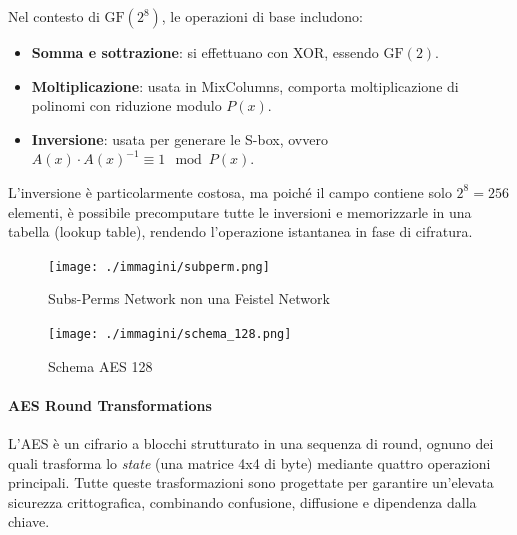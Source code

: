 \documentclass{report}
\begin{document}
Nel contesto di $\text{GF}(2^8)$, le operazioni di base includono:

\begin{itemize}
    \item \textbf{Somma e sottrazione}: si effettuano con XOR, essendo $\text{GF}(2)$.
    \item \textbf{Moltiplicazione}: usata in MixColumns, comporta moltiplicazione di polinomi con riduzione modulo $P(x)$.
    \item \textbf{Inversione}: usata per generare le S-box, ovvero $A(x) \cdot A(x)^{-1} \equiv 1 \mod P(x)$.
\end{itemize}

L’inversione è particolarmente costosa, ma poiché il campo contiene solo $2^8 = 256$ elementi, è possibile precomputare tutte le inversioni e memorizzarle in una tabella (lookup table), rendendo l’operazione istantanea in fase di cifratura.

\begin{figure}[h]
    \centering
    \texttt{[image: ./immagini/subperm.png]}
    \caption{Subs-Perms Network non una Feistel Network}
    \end{figure}
    
    \begin{figure}[h]
    \centering
    \texttt{[image: ./immagini/schema\_128.png]}
    \caption{Schema AES 128}
    \end{figure}
\paragraph{AES Round Transformations}

L'AES è un cifrario a blocchi strutturato in una sequenza di round, ognuno dei quali trasforma lo \textit{state} (una matrice 4x4 di byte) mediante quattro operazioni principali. Tutte queste trasformazioni sono progettate per garantire un’elevata sicurezza crittografica, combinando confusione, diffusione e dipendenza dalla chiave.
\end{document}

